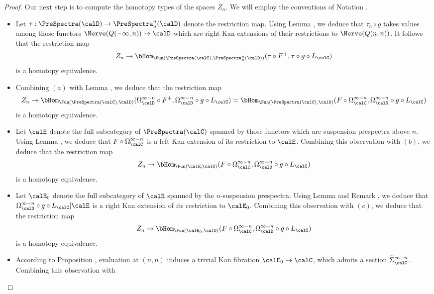 \begin{proof}
Our next step is to compute the homotopy types of the spaces $Z_n$. 
We will employ the conventions of Notation .
\begin{itemize}
\item[$(a)$] Let $\tau: \PreSpectra(\calD) \rightarrow \PreSpectra^{n}_{n}(\calD)$
denote the restriction map. Using Lemma , we deduce that
$\tau_n \circ g$ takes values among those functors $\Nerve( Q(-\infty,n)) \rightarrow \calD$
which are right Kan extensions of their restrictions to $\Nerve( Q(n,n) )$. It
follows that the restriction map
$$ Z_n \rightarrow \bHom_{ \Fun( \PreSpectra(\calC), \PreSpectra^{n}_{n}(\calD))}(
\tau \circ F^{+}, \tau \circ g \circ L_{\calC})$$
is a homotopy equivalence.
\item[$(b)$] Combining $(a)$ with Lemma , we deduce that
the restriction map
$$ Z_{n} \rightarrow \bHom_{ \Fun( \PreSpectra(\calC), \calD)}( \Omega^{\infty-n}_{\calD} \circ F^{+},
\Omega^{\infty-n}_{\calD} \circ g \circ L_{\calC}) =
\bHom_{ \Fun( \PreSpectra(\calC), \calD)}( F \circ \Omega^{\infty-n}_{\calC}, \Omega^{\infty-n}_{\calD} \circ g \circ L_{\calC} )$$
is a homotopy equivalence.
\item[$(c)$] Let $\calE$ denote the full subcategory of
$\PreSpectra(\calC)$ spanned by those functors which are suspension prespectra above $n$.
Using Lemma , we deduce that $F \circ \Omega^{\infty-n}_{\calC}$ is a left
Kan extension of its restriction to $\calE$. Combining this
observation with $(b)$, we deduce that the restriction map
$$ Z_{n} \rightarrow \bHom_{\Fun(\calE, \calD)}( 
F \circ \Omega^{\infty-n}_{\calC}, \Omega^{\infty-n}_{\calD} \circ g \circ L_{\calC} )$$
is a homotopy equivalence.
\item[$(d)$] Let $\calE_0$ denote the full subcategory of
$\calE$ spanned by the $n$-suspension prespectra.
Using Lemma  and Remark , we deduce that 
$\Omega^{\infty-n}_{\calD} \circ g \circ L_{\calC}| \calE$ is a right Kan extension of its restriction to $\calE_0$. Combining this observation with
$(c)$, we deduce that the restriction map
$$ Z_n \rightarrow \bHom_{ \Fun( \calE_0, \calD)}( 
F \circ \Omega^{\infty-n}_{\calC}, \Omega^{\infty-n}_{\calD} \circ g \circ L_{\calC} )$$
is a homotopy equivalence.
\item[$(e)$] According to Proposition , evaluation at $(n,n)$ induces a trivial Kan
fibration $\calE_0 \rightarrow \calC$, which admits a section
$\widetilde{\Sigma}^{\infty-n}_{\calC}$. Combining this observation with

\end{itemize}
\end{proof}
